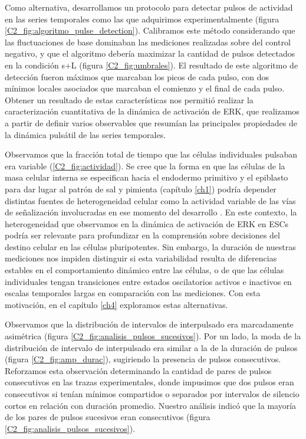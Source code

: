 \documentclass[./main.tex]{subfiles}
\begin{document}
Como alternativa, desarrollamos un protocolo para detectar pulsos de actividad en las series temporales como las que adquirimos experimentalmente (figura \ref{C2_fig:algoritmo_pulse_detection}). Calibramos este método considerando que las fluctuaciones de base dominaban las mediciones realizadas sobre del control negativo, y que el algoritmo debería maximizar la cantidad de pulsos detectados en la condición s+L (figura \ref{C2_fig:umbrales}). El resultado de este algoritmo de detección fueron máximos que marcaban los picos de cada pulso, con dos mínimos locales asociados que marcaban el comienzo y el final de cada pulso. Obtener un resultado de estas características nos permitió realizar la caracterización cuantitativa de la dinámica de activación de ERK, que realizamos a partir de definir varios observables que resumían las principales propiedades de la dinámica pulsátil de las series temporales. 


Observamos que la fracción total de tiempo que las células individuales pulsaban era variable (\ref{C2_fig:actividad}). Se cree que la forma en que las células de la masa celular interna se especifican hacia el endodermo primitivo y el epiblasto para dar lugar al patrón de sal y pimienta (capítulo \ref{ch1}) podría depender distintas fuentes de heterogeneidad celular como la actividad variable de las vías de señalización involucradas en ese momento del desarrollo \cite{Pokrass2020,Saiz2016}. En este contexto, la heterogeneidad que observamos en la dinámica de activación de ERK en ESCs podría ser relevante para profundizar en la comprensión sobre decisiones del destino celular en las células pluripotentes. Sin embargo, la duración de nuestras mediciones nos impiden distinguir si esta variabilidad resulta de diferencias estables en el comportamiento dinámico entre las células, o de que las células individuales tengan transiciones entre estados oscilatorios activos e inactivos en escalas temporales largas en comparación con las mediciones. Con esta motivación, en el capítulo \ref{ch4} exploramos estas alternativas. 


Observamos que la distribución de intervalos de interpulsado era marcadamente asimétrica (figura \ref{C2_fig:analisis_pulsos_sucesivos}). Por un lado, la moda de la distribución de intervalo de interpulsado era similar a la de la duración de pulsos (figura \ref{C2_fig:amp_durac}), sugiriendo la presencia de pulsos consecutivos. Reforzamos esta observación determinando la cantidad de pares de pulsos consecutivos en las trazas experimentales, donde impusimos que dos pulsos eran consecutivos si tenían mínimos compartidos o separados por intervalos de silencio cortos en relación con duración promedio. Nuestro análisis indicó que la mayoría de los pares de pulsos sucesivos eran consecutivos (figura \ref{C2_fig:analisis_pulsos_sucesivos}).
\end{document}
